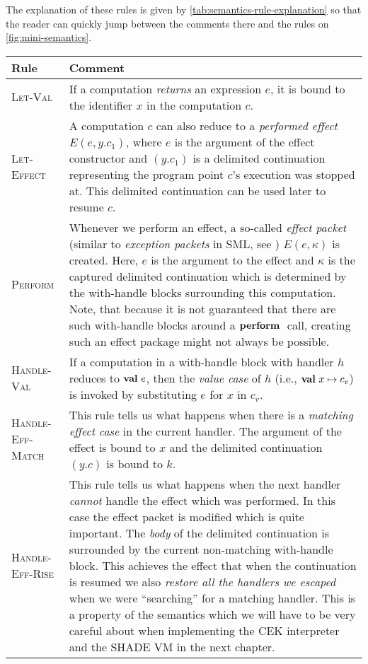 \documentclass[class=article, crop=false]{standalone}
\begin{document}
The explanation of these rules is given by \autoref{tab:semantics-rule-explanation}
so that the reader can quickly jump between the comments there and the rules on
\autoref{fig:mini-semantics}.

\begin{table}
  \centering
  {\renewcommand{\arraystretch}{1.3}
  \begin{tabular}{lp{10cm}}
  \toprule
  Rule & Comment \\
  \midrule
  \textsc{Let-Val} & 
    If a computation \emph{returns} an expression $e$, it is bound to the
    identifier $x$ in the computation $c$. \\

  \textsc{Let-Effect} & 
    A computation $c$ can also reduce to a \emph{performed effect} $E(e, y.c_1)$,
    where $e$ is the argument of the effect constructor and $(y.c_1)$ is a
    delimited continuation representing the program point $c$'s execution was
    stopped at. This delimited continuation can be used later to resume $c$. \\

  \textsc{Perform} &
    Whenever we perform an effect, a so-called \emph{effect packet} (similar to
    \emph{exception packets} in SML, see \cite{paulson1996ml}) $E(e, \kappa)$
    is created. Here, $e$ is the argument to the effect and $\kappa$ is the
    captured delimited continuation which is determined by the with-handle
    blocks surrounding this computation. Note, that because it is not guaranteed
    that there are such with-handle blocks around a $\mathbf{perform}\ $ call, creating
    such an effect package might not always be possible. \\

  \textsc{Handle-Val} & 
    If a computation in a with-handle block with handler $h$ reduces to
    $\mathbf{val}\  e$, then the \emph{value case} of $h$ (i.e., $\mathbf{val}\  x \mapsto c_v$)
    is invoked by substituting $e$ for $x$ in $c_v$. \\

  \textsc{Handle-Eff-Match} &
    This rule tells us what happens when there is a \emph{matching effect case}
    in the current handler. The argument of the effect is bound to $x$ and the
    delimited continuation $(y.c)$ is bound to $k$. \\

  \textsc{Handle-Eff-Rise} &
    This rule tells us what happens when the next handler \emph{cannot} handle
    the effect which was performed. In this case the effect packet is modified
    which is quite important. The \emph{body} of the delimited continuation is
    surrounded by the current non-matching with-handle block. This achieves the
    effect that when the continuation is resumed we also \emph{restore all the
    handlers we escaped} when we were ``searching'' for a matching handler.
    This is a property of the semantics which we will have to be very careful
    about when implementing the CEK interpreter and the SHADE VM in the next
    chapter.\\


\end{tabular}}
\end{table}
\end{document}
